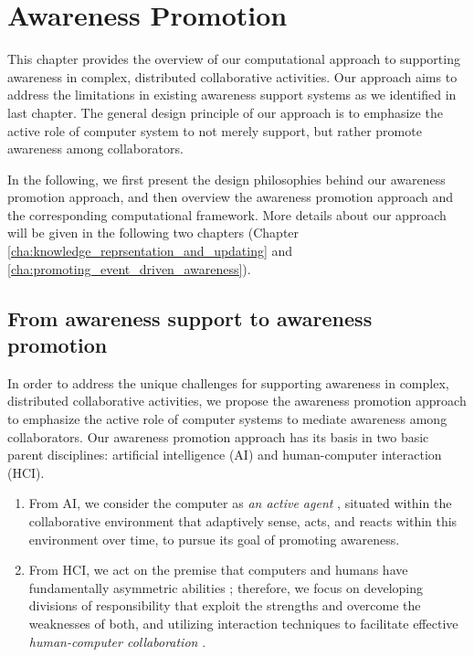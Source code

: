 \graphicspath{{Figures/}}

\chapter{Awareness Promotion} %
\label{cha:awareness_promotion}
This chapter provides the overview of our computational approach to supporting awareness in complex, distributed collaborative activities. Our approach aims to address the limitations in existing awareness support systems as we identified in last chapter. The general design principle of our approach is to emphasize the active role of computer system to not merely support, but rather promote awareness among collaborators.

In the following, we first present the design philosophies behind our awareness promotion approach, and then overview the awareness promotion approach and the corresponding computational framework. More details about our approach will be given in the following two chapters (Chapter \ref{cha:knowledge_reprsentation_and_updating} and \ref{cha:promoting_event_driven_awareness}).

\section{From awareness support to awareness promotion} %
\label{sec:from_awareness_support_to_awareness_promotion}
In order to address the unique challenges for supporting awareness in complex, distributed collaborative activities, we propose the awareness promotion approach to emphasize the active role of computer systems to mediate awareness among collaborators. Our awareness promotion approach has its basis in two basic parent disciplines:  artificial intelligence (AI) and human-computer interaction (HCI). 
\begin{enumerate}
   \item From AI, we consider the computer as \emph{an active agent} \cite{Brown99activeuser}, situated within the collaborative environment that adaptively sense, acts, and reacts within this environment over time, to pursue its goal of promoting awareness.
   \item From HCI, we act on the premise that computers and humans have fundamentally asymmetric abilities \cite{Dalal1994}; therefore, we focus on developing divisions of responsibility that exploit the strengths and overcome the weaknesses of both, and utilizing interaction techniques to facilitate effective \emph{human-computer collaboration} \cite{Terveen1995}.
\end{enumerate}

